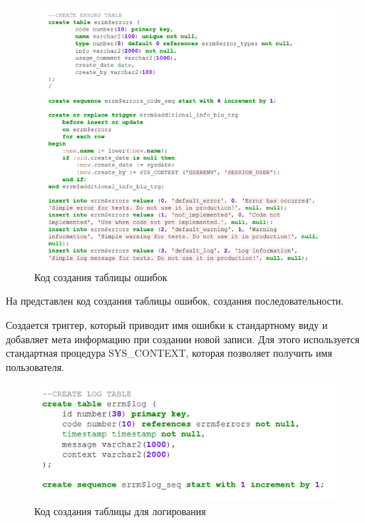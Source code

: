 \begin{figure}[ht!] 
	\center
	\includegraphics [scale=1] {my_folder/img/c3_create_errrors_table.png}
	\caption{Код создания таблицы ошибок} 
	\label{fig:c3_create_errrors_table}  
\end{figure}
\FloatBarrier

На  представлен код создания таблицы ошибок, создания последовательности. 

Создается триггер, который приводит имя ошибки к стандартному виду и добавляет мета информацию при создании новой записи. Для этого используется стандартная процедура SYS\_CONTEXT, которая позволяет получить имя пользователя. 

\begin{figure}[ht!] 
	\center
	\includegraphics [scale=1] {my_folder/img/C3_create_log_table.png}
	\caption{Код создания таблицы для логирования} 
	\label{fig:C3_create_log_table}  
\end{figure}
\FloatBarrier

